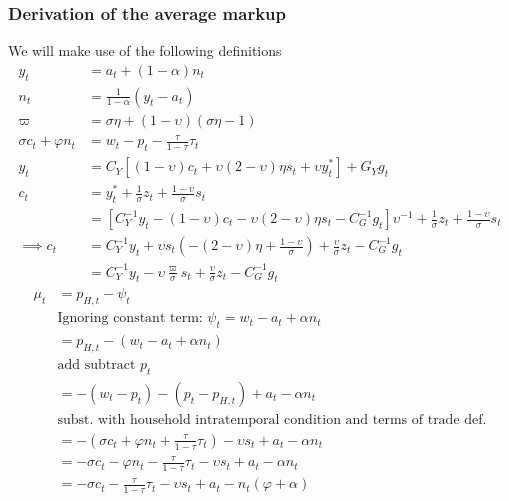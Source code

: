 \subsubsection{Derivation of the average markup}
We will make use of the following definitions
\begin{align}\label{eq:appendix_average_markup_beginning}
    y_t &= a_t + (1-\alpha)n_t\\
    n_t &= \frac{1}{1-\alpha}(y_t - a_t)\\
    \varpi &= \sigma \eta + (1-\upsilon)(\sigma \eta - 1)\\
    \sigma c_t + \varphi n_t &= w_t - p_t - \frac{\tau}{1-\tau}\tau_t\\
    y_t &= C_Y\left[(1-\upsilon)c_t + \upsilon (2-\upsilon)\eta s_t + \upsilon y^*_t\right] + G_Y g_t\\
    c_t &= y_t^* + \frac{1}{\sigma}z_t + \frac{1-\upsilon}{\sigma}s_t\\
    &= \left[C_Y^{-1} y_t -(1-\upsilon)c_t - \upsilon(2-\upsilon)\eta s_t - C^{-1}_G g_t \right]\upsilon^{-1} + \frac{1}{\sigma}z_t + \frac{1-\upsilon}{\sigma}s_t\\
    \implies c_t &= C_Y^{-1} y_t + \upsilon s_t \left( -(2-\upsilon)\eta + \frac{1-\upsilon}{\sigma}\right) + \frac{\upsilon}{\sigma}z_t - C_G^{-1} g_t \\
     &= C_Y^{-1} y_t - \upsilon \frac{\varpi}{\sigma} s_t + \frac{\upsilon}{\sigma}z_t - C_G^{-1} g_t
\end{align}
\begin{align}
    \mu_t &= p_{H,t} - \psi_t \\ 
    &\text{Ignoring constant term: $\psi_t = w_t - a_t + \alpha n_t$} \nonumber\\
    &= p_{H,t} - (w_t - a_t + \alpha n_t)\\
    &\text{add subtract $p_t$} \nonumber\\
    &=-(w_t-p_t) - (p_t - p_{H,t}) + a_t - \alpha n_t \label{eq:appendix_average_markup_add_subtract_p}\\
    &\text{subst. with household intratemporal condition and terms of trade def.} \nonumber\\
    &= -(\sigma c_t + \varphi n_t + \frac{\tau}{1-\tau}\tau_t) - \upsilon s_t + a_t - \alpha n_t\\
    &= -\sigma c_t - \varphi n_t - \frac{\tau}{1-\tau}\tau_t - \upsilon s_t + a_t - \alpha n_t\\
    &= -\sigma c_t - \frac{\tau}{1-\tau}\tau_t - \upsilon s_t + a_t - n_t(\varphi + \alpha)
\end{align}

